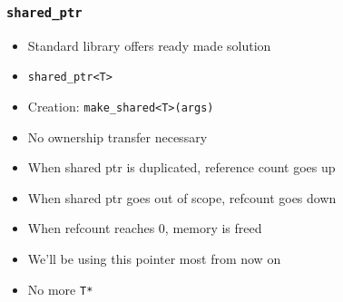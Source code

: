 \documentclass{../ucll-slides}
\begin{document}
\begin{frame}
  \frametitle{\tt shared\_ptr}
  \begin{itemize}
    \item Standard library offers ready made solution
    \item {\tt shared\_ptr<T>}
    \item Creation: {\tt make\_shared<T>(args)}
    \item No ownership transfer necessary
    \item When shared ptr is duplicated, reference count goes up
    \item When shared ptr goes out of scope, refcount goes down
    \item When refcount reaches 0, memory is freed
    \item We'll be using this pointer most from now on
    \item No more {\tt T*}
  \end{itemize}
\end{frame}
\end{document}
